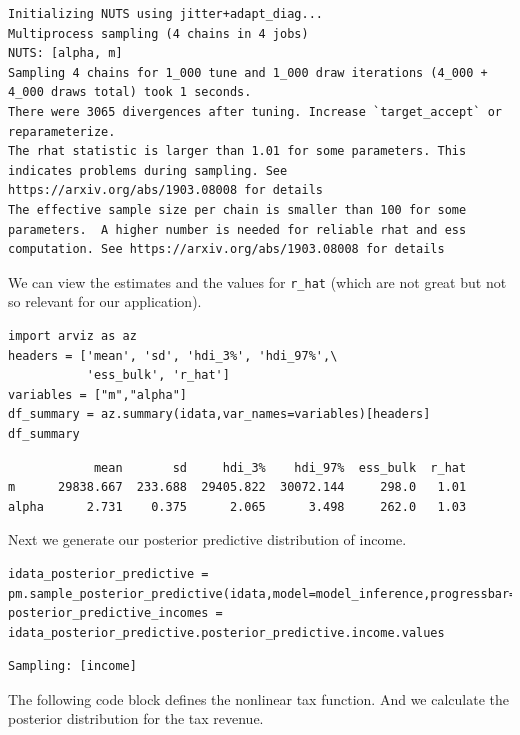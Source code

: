 \documentclass[11pt]{article}
\begin{document}
\label{}
\begin{verbatim}
Initializing NUTS using jitter+adapt_diag...
Multiprocess sampling (4 chains in 4 jobs)
NUTS: [alpha, m]
Sampling 4 chains for 1_000 tune and 1_000 draw iterations (4_000 + 4_000 draws total) took 1 seconds.
There were 3065 divergences after tuning. Increase `target_accept` or reparameterize.
The rhat statistic is larger than 1.01 for some parameters. This indicates problems during sampling. See https://arxiv.org/abs/1903.08008 for details
The effective sample size per chain is smaller than 100 for some parameters.  A higher number is needed for reliable rhat and ess computation. See https://arxiv.org/abs/1903.08008 for details
\end{verbatim}


We can view the estimates and the values for \texttt{r\_hat} (which are not great but not so relevant for our application).

\begin{verbatim}
import arviz as az
headers = ['mean', 'sd', 'hdi_3%', 'hdi_97%',\
           'ess_bulk', 'r_hat']
variables = ["m","alpha"]
df_summary = az.summary(idata,var_names=variables)[headers]
df_summary
\end{verbatim}

\label{}
\begin{verbatim}
            mean       sd     hdi_3%    hdi_97%  ess_bulk  r_hat
m      29838.667  233.688  29405.822  30072.144     298.0   1.01
alpha      2.731    0.375      2.065      3.498     262.0   1.03
\end{verbatim}



Next we generate our posterior predictive distribution of income.

\begin{verbatim}
idata_posterior_predictive = pm.sample_posterior_predictive(idata,model=model_inference,progressbar=False)
posterior_predictive_incomes = idata_posterior_predictive.posterior_predictive.income.values
\end{verbatim}

\label{}
\begin{verbatim}
Sampling: [income]
\end{verbatim}


The following code block defines the nonlinear tax function. And we calculate the posterior distribution for the tax revenue.
\end{document}
